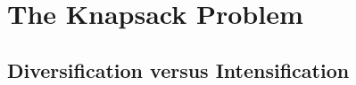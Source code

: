

\usepackage{lipsum}




\tableofcontents
\thispagestyle{empty}	%
\newpage
{} %

\section{The Knapsack Problem}
\subsection{Diversification versus Intensification}
